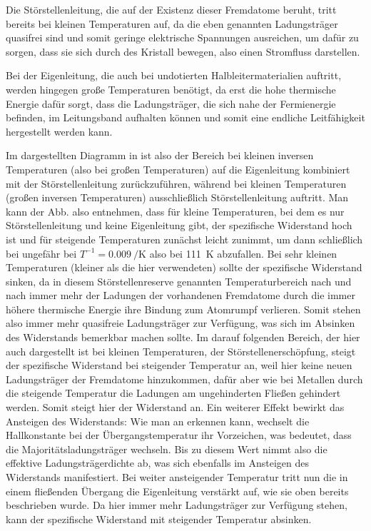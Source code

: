 Die Störstellenleitung, die auf der Existenz dieser Fremdatome beruht, tritt
bereits bei kleinen Temperaturen auf, da die eben genannten Ladungsträger
quasifrei sind und somit geringe elektrische Spannungen ausreichen, um dafür zu
sorgen, dass sie sich durch des Kristall bewegen, also einen Stromfluss
darstellen.

Bei der Eigenleitung, die auch bei undotierten Halbleitermaterialien auftritt,
werden hingegen große Temperaturen benötigt, da erst die hohe thermische Energie
dafür sorgt, dass die Ladungsträger, die sich nahe der Fermienergie befinden, im
Leitungsband aufhalten können und somit eine endliche Leitfähigkeit hergestellt
werden kann. 

Im dargestellten Diagramm in  ist also der Bereich bei kleinen
inversen Temperaturen (also bei großen Temperaturen) auf die Eigenleitung
kombiniert mit der Störstellenleitung zurückzuführen, während bei kleinen
Temperaturen (großen inversen Temperaturen) ausschließlich Störstellenleitung
auftritt. Man kann der Abb. also entnehmen, dass für kleine Temperaturen,
bei dem es nur Störstellenleitung und keine Eigenleitung gibt, der spezifische
Widerstand hoch ist und für steigende Temperaturen zunächst leicht zunimmt, um
dann schließlich bei ungefähr bei $T^{-1} = \SI{0,009}{\per\kelvin}$ also bei \SI{111}{\kelvin}
abzufallen. Bei sehr kleinen Temperaturen (kleiner als die hier verwendeten)
sollte der spezifische Widerstand sinken, da in diesem Störstellenreserve
genannten Temperaturbereich nach und nach immer mehr der Ladungen
der vorhandenen Fremdatome durch die immer höhere thermische Energie ihre
Bindung zum Atomrumpf verlieren. Somit stehen also immer mehr quasifreie
Ladungsträger zur Verfügung, was sich im Absinken des Widerstands bemerkbar
machen sollte. Im darauf folgenden Bereich, der hier auch dargestellt ist bei
kleinen Temperaturen, der Störstellenerschöpfung, steigt der spezifische
Widerstand bei steigender Temperatur an, weil hier keine neuen Ladungsträger
der Fremdatome hinzukommen, dafür aber wie bei Metallen durch die steigende
Temperatur die Ladungen am ungehinderten Fließen gehindert werden. Somit steigt
hier der Widerstand an. Ein weiterer Effekt bewirkt das Ansteigen des
Widerstands: Wie man an  erkennen kann, wechselt die
Hallkonstante bei der Übergangstemperatur ihr Vorzeichen, was bedeutet, dass
die Majoritätsladungsträger wechseln. Bis zu diesem Wert nimmt also die
effektive Ladungsträgerdichte ab, was sich ebenfalls im Ansteigen des
Widerstands manifestiert. Bei weiter ansteigender Temperatur tritt nun die in
einem fließenden Übergang die Eigenleitung verstärkt auf, wie sie oben bereits
beschrieben wurde. Da hier immer mehr Ladungsträger zur Verfügung stehen, kann
der spezifische Widerstand mit steigender Temperatur absinken.

